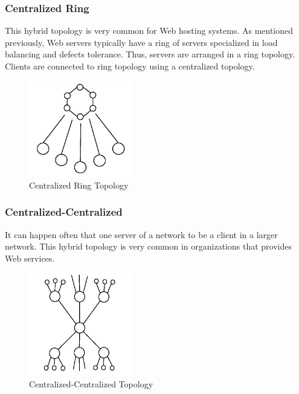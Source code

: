 \subsubsection{Centralized Ring}

This hybrid topology is very common for Web hosting systems. As mentioned
previously, Web servers typically have a ring of servers specialized in load
balancing and defects tolerance. Thus, servers are arranged in a ring topology.
Clients are connected to ring topology using a centralized topology.

\begin{figure}
  \centering
  \includegraphics[width=0.4\textwidth]{src/img/p2p-systems/centralized-ring}
  \caption{Centralized Ring Topology}
  \label{fig:p2p-systems:centralized-ring}
\end{figure}

\subsubsection{Centralized-Centralized}

It can happen often that one server of a network to be a client in a larger
network. This hybrid topology is very common in organizations that provides
Web services.

\begin{figure}
  \centering
  \includegraphics[width=0.4\textwidth]{src/img/p2p-systems/centralized-centralized}
  \caption{Centralized-Centralized Topology}
  \label{fig:p2p-systems:centralized-centralized}
\end{figure}

